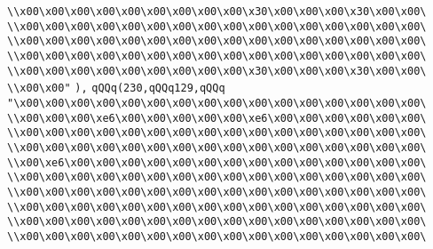 \verb|\\x00\x00\x00\x00\x00\x00\x00\x00\x00\x30\x00\x00\x00\x30\x00\x00\|\newline
\verb|\\x00\x00\x00\x00\x00\x00\x00\x00\x00\x00\x00\x00\x00\x00\x00\x00\|\newline
\verb|\\x00\x00\x00\x00\x00\x00\x00\x00\x00\x00\x00\x00\x00\x00\x00\x00\|\newline
\verb|\\x00\x00\x00\x00\x00\x00\x00\x00\x00\x00\x00\x00\x00\x00\x00\x00\|\newline
\verb|\\x00\x00\x00\x00\x00\x00\x00\x00\x00\x30\x00\x00\x00\x30\x00\x00\|\newline
\verb|\\x00\x00"|\newline
\verb|),|\newline
\verb|qQQq(230,qQQq129,qQQq|\newline
\verb|"\x00\x00\x00\x00\x00\x00\x00\x00\x00\x00\x00\x00\x00\x00\x00\x00\|\newline
\verb|\\x00\x00\x00\xe6\x00\x00\x00\x00\x00\xe6\x00\x00\x00\x00\x00\x00\|\newline
\verb|\\x00\x00\x00\x00\x00\x00\x00\x00\x00\x00\x00\x00\x00\x00\x00\x00\|\newline
\verb|\\x00\x00\x00\x00\x00\x00\x00\x00\x00\x00\x00\x00\x00\x00\x00\x00\|\newline
\verb|\\x00\xe6\x00\x00\x00\x00\x00\x00\x00\x00\x00\x00\x00\x00\x00\x00\|\newline
\verb|\\x00\x00\x00\x00\x00\x00\x00\x00\x00\x00\x00\x00\x00\x00\x00\x00\|\newline
\verb|\\x00\x00\x00\x00\x00\x00\x00\x00\x00\x00\x00\x00\x00\x00\x00\x00\|\newline
\verb|\\x00\x00\x00\x00\x00\x00\x00\x00\x00\x00\x00\x00\x00\x00\x00\x00\|\newline
\verb|\\x00\x00\x00\x00\x00\x00\x00\x00\x00\x00\x00\x00\x00\x00\x00\x00\|\newline
\verb|\\x00\x00\x00\x00\x00\x00\x00\x00\x00\x00\x00\x00\x00\x00\x00\x00\|\newline

